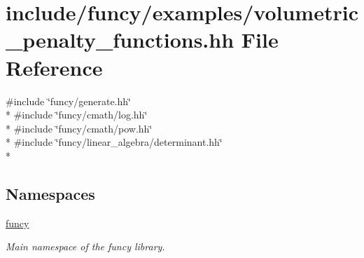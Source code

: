 \hypertarget{volumetric__penalty__functions_8hh}{\section{include/funcy/examples/volumetric\-\_\-penalty\-\_\-functions.hh File Reference}
\label{volumetric__penalty__functions_8hh}
}
{\ttfamily \#include \char`\"{}funcy/generate.\-hh\char`\"{}}\\*
{\ttfamily \#include \char`\"{}funcy/cmath/log.\-hh\char`\"{}}\\*
{\ttfamily \#include \char`\"{}funcy/cmath/pow.\-hh\char`\"{}}\\*
{\ttfamily \#include \char`\"{}funcy/linear\-\_\-algebra/determinant.\-hh\char`\"{}}\\*
\subsection*{Namespaces}
\begin{DoxyCompactItemize}
\item 
\hyperlink{namespacefuncy}{funcy}
\begin{DoxyCompactList}\small\item\em Main namespace of the funcy library. \end{DoxyCompactList}\end{DoxyCompactItemize}
